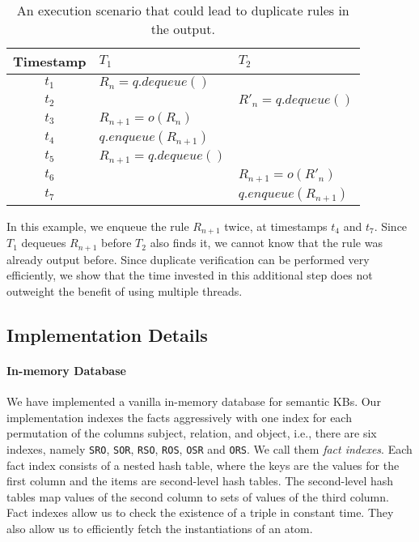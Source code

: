 \begin{table}
\centering
 \begin{tabular}{c|l|l}
  Timestamp & $T_1$ & $T_2$\\  \hline
  $t_1$ & $R_n = q.dequeue()$	&  \\
  $t_2$ & & $R'_n = q.dequeue()$ \\
  $t_3$ & $R_{n+1} = o(R_n)$  & \\
  $t_4$ & $q.enqueue(R_{n+1})$  & \\
  $t_5$ & $R_{n+1} = q.dequeue()$ & \\
  $t_6$ & & $R_{n+1} = o(R'_n)$ \\
  $t_7$ & & $q.enqueue(R_{n+1})$ \\
\end{tabular}
\caption{An execution scenario that could lead to duplicate rules in the output.}\label{tab:duplicates}
\end{table}

In this example, we enqueue the rule $R_{n+1}$ twice, at timestamps $t_4$ and $t_7$. 
Since $T_1$ dequeues $R_{n+1}$ before $T_2$ also finds it, 
we cannot know that the rule was already output before. 
Since duplicate verification
can be performed very efficiently, we show that the time invested in this additional step does not  
outweight the benefit of using multiple threads.



\subsection{Implementation Details}
\label{subsec:implementation}

\paragraph{In-memory Database}
We have implemented a vanilla in-memory database for semantic KBs.
Our implementation indexes the facts aggressively with one index for each permutation of 
the columns subject, relation, and object, i.e., there are six indexes, namely \texttt{SRO}, \texttt{SOR}, 
\texttt{RSO}, \texttt{ROS}, \texttt{OSR} and \texttt{ORS}. We call them \emph{fact indexes}.
Each fact index consists of a nested hash table, where the keys are the values for the first column and the items
are second-level hash tables. The second-level hash tables map values of the second column
to sets of values of the third column. 
Fact indexes allow us to check the existence of a triple in constant time. They also allow us to efficiently fetch the
instantiations of an atom.
% 

